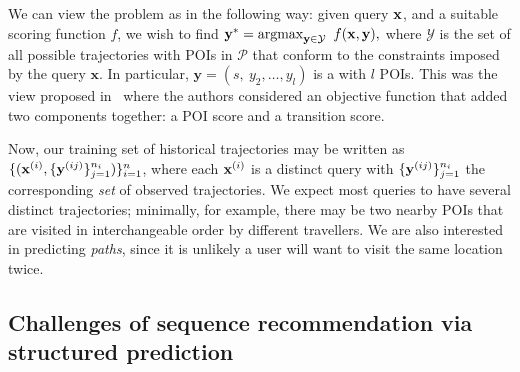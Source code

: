 We can view the {\trajrec} problem as {\seqrec} in the following way:
given {\trajectory} query $\mathbf{x}$, and a suitable scoring function $f$, we wish to find
$\mathbf{y}^* = \operatorname*{argmax}_{\mathbf{y} \in \mathcal{Y}}~f(\mathbf{x}, \mathbf{y}),$
where $\mathcal{Y}$ is the set of all possible trajectories with POIs in $\mathcal{P}$ that conform to the constraints imposed by the query $\mathbf{x}$.
In particular,
$\mathbf{y} = (s,~ y_2, \dots, y_l)$ is a {\trajectory} with $l$ POIs. %
This was the view proposed in~\cite{cikm16paper} where the authors considered an
objective function that added two components together: a POI score and a transition score.

Now, our training set of historical trajectories may be written as
$\{ ( \mathbf{x}^{({i})}, \{ \mathbf{y}^{({ij})} \}_{j=1}^{n_i} ) \}_{i=1}^{n}$,
where each $\mathbf{x}^{({i})}$ is a distinct query
with $\{ \mathbf{y}^{({ij})} \}_{j=1}^{n_i}$ the corresponding \emph{set} of observed trajectories.
We expect most queries to have several distinct trajectories;
minimally,
for example,
there may be two nearby POIs that are visited in interchangeable order by different travellers.
We are also interested in predicting \emph{paths}, %
since it is unlikely a user will want to visit the same location twice.




\subsection{Challenges of sequence recommendation via structured prediction}

